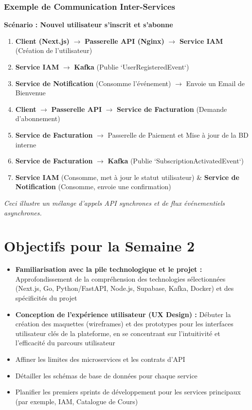\documentclass[12pt, a4paper]{article}
\begin{document}
\subsubsection{Exemple de Communication Inter-Services}
\textbf{Scénario : Nouvel utilisateur s'inscrit et s'abonne}
\begin{enumerate}
  \item \textbf{Client (Next.js)} $\rightarrow$ \textbf{Passerelle API (Nginx)} $\rightarrow$ \textbf{Service IAM} (Création de l'utilisateur)
  \item \textbf{Service IAM} $\rightarrow$ \textbf{Kafka} (Publie `UserRegisteredEvent`)
  \item \textbf{Service de Notification} (Consomme l'événement) $\rightarrow$ Envoie un Email de Bienvenue
  \item \textbf{Client} $\rightarrow$ \textbf{Passerelle API} $\rightarrow$ \textbf{Service de Facturation} (Demande d'abonnement)
  \item \textbf{Service de Facturation} $\rightarrow$ Passerelle de Paiement et Mise à jour de la BD interne
  \item \textbf{Service de Facturation} $\rightarrow$ \textbf{Kafka} (Publie `SubscriptionActivatedEvent`)
  \item \textbf{Service IAM} (Consomme, met à jour le statut utilisateur) \& \textbf{Service de Notification} (Consomme, envoie une confirmation)
\end{enumerate}
\textit{Ceci illustre un mélange d'appels API synchrones et de flux événementiels asynchrones.}

\section{Objectifs pour la Semaine 2}
\begin{itemize}
  \item \textbf{Familiarisation avec la pile technologique et le projet :} Approfondissement de la compréhension des technologies sélectionnées (Next.js, Go, Python/FastAPI, Node.js, Supabase, Kafka, Docker) et des spécificités du projet
  \item \textbf{Conception de l'expérience utilisateur (UX Design) :} Débuter la création des maquettes (wireframes) et des prototypes pour les interfaces utilisateur clés de la plateforme, en se concentrant sur l'intuitivité et l'efficacité du parcours utilisateur
  \item Affiner les limites des microservices et les contrats d'API
  \item Détailler les schémas de base de données pour chaque service
  \item Planifier les premiers sprints de développement pour les services principaux (par exemple, IAM, Catalogue de Cours)
\end{itemize}
\end{document}
